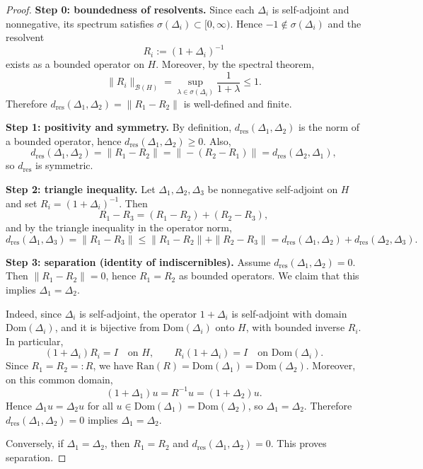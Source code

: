 \documentclass{amsart}
\numberwithin{equation}{section}
\theoremstyle{definition}
\theoremstyle{remark}
\begin{document}
\begin{proof}
\noindent\textbf{Step 0: boundedness of resolvents.}
Since each $\Delta_i$ is self-adjoint and nonnegative, its spectrum satisfies
$\sigma(\Delta_i)\subset[0,\infty)$. Hence $-1\notin\sigma(\Delta_i)$ and the resolvent
\[
R_i:=(1+\Delta_i)^{-1}
\]
exists as a bounded operator on $H$. Moreover, by the spectral theorem,
\[
\|R_i\|_{\mathcal B(H)}=\sup_{\lambda\in\sigma(\Delta_i)}\frac{1}{1+\lambda}\le 1.
\]
Therefore $d_{\mathrm{res}}(\Delta_1,\Delta_2)=\|R_1-R_2\|$ is well-defined and finite.

\medskip
\noindent\textbf{Step 1: positivity and symmetry.}
By definition, $d_{\mathrm{res}}(\Delta_1,\Delta_2)$ is the norm of a bounded operator, hence
$d_{\mathrm{res}}(\Delta_1,\Delta_2)\ge 0$. Also,
\[
d_{\mathrm{res}}(\Delta_1,\Delta_2)
=\|R_1-R_2\|
=\|-(R_2-R_1)\|
=d_{\mathrm{res}}(\Delta_2,\Delta_1),
\]
so $d_{\mathrm{res}}$ is symmetric.

\medskip
\noindent\textbf{Step 2: triangle inequality.}
Let $\Delta_1,\Delta_2,\Delta_3$ be nonnegative self-adjoint on $H$ and set $R_i=(1+\Delta_i)^{-1}$.
Then
\[
R_1-R_3=(R_1-R_2)+(R_2-R_3),
\]
and by the triangle inequality in the operator norm,
\[
d_{\mathrm{res}}(\Delta_1,\Delta_3)=\|R_1-R_3\|
\le \|R_1-R_2\|+\|R_2-R_3\|
=d_{\mathrm{res}}(\Delta_1,\Delta_2)+d_{\mathrm{res}}(\Delta_2,\Delta_3).
\]

\medskip
\noindent\textbf{Step 3: separation (identity of indiscernibles).}
Assume $d_{\mathrm{res}}(\Delta_1,\Delta_2)=0$. Then $\|R_1-R_2\|=0$, hence $R_1=R_2$ as bounded operators.
We claim that this implies $\Delta_1=\Delta_2$.

Indeed, since $\Delta_i$ is self-adjoint, the operator $1+\Delta_i$ is self-adjoint with domain
$\mathrm{Dom}(\Delta_i)$, and it is bijective from $\mathrm{Dom}(\Delta_i)$ onto $H$, with bounded inverse $R_i$.
In particular,
\[
(1+\Delta_i)R_i=I \quad\text{on }H,
\qquad
R_i(1+\Delta_i)=I \quad\text{on }\mathrm{Dom}(\Delta_i).
\]
Since $R_1=R_2=:R$, we have $\mathrm{Ran}(R)=\mathrm{Dom}(\Delta_1)=\mathrm{Dom}(\Delta_2)$.
Moreover, on this common domain,
\[
(1+\Delta_1)u = R^{-1}u = (1+\Delta_2)u.
\]
Hence $\Delta_1u=\Delta_2u$ for all $u\in\mathrm{Dom}(\Delta_1)=\mathrm{Dom}(\Delta_2)$, so $\Delta_1=\Delta_2$.
Therefore $d_{\mathrm{res}}(\Delta_1,\Delta_2)=0$ implies $\Delta_1=\Delta_2$.

Conversely, if $\Delta_1=\Delta_2$, then $R_1=R_2$ and $d_{\mathrm{res}}(\Delta_1,\Delta_2)=0$.
This proves separation.


\end{proof}
\end{document}
